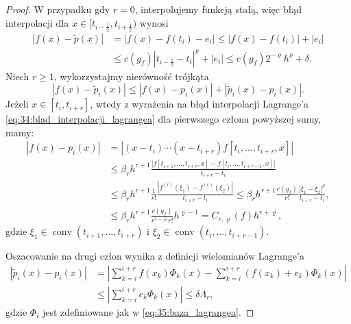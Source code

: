 \documentclass[oik, pdftex, man]{mgrwms}
\DeclareMathOperator*{\conv}{conv}
\begin{document}
    \begin{proof}
        W przypadku gdy $r=0$, interpolujemy funkcją stałą, więc błąd interpolacji dla $x \in [t_{i - \frac{1}{2}}, t_{i + \frac{1}{2}})$ wynosi
        \begin{equation*}
            \begin{aligned}                
                |f(x) - \tilde{p}(x)| &= |f(x) - f(t_{i}) - e_{i}| \leq |f(x) - f(t_{i})| + |e_{i}| \\
                    &\leq c(g_{f}) \left|t_{i-\frac{1}{2}} - t_{i}\right|^{\varrho} + |e_{i}| \leq c(g_{f}) 2^{-\varrho}h^{\varrho} + \delta.
            \end{aligned}
        \end{equation*}
        Niech $r \geq 1$, wykorzystajmy nierówność trójkąta
        \begin{equation*}
            \left|f(x)-\tilde{p}_{i}(x)\right| \leq\left|f(x)-p_{i}(x)\right|+\left|\tilde{p}_{i}(x)-p_{i}(x)\right|.
        \end{equation*}
        Jeżeli $x \in\left[t_{i}, t_{i+r}\right]$, wtedy z wyrażenia na błąd interpolacji Lagrange'a \eqref{eq:34:blad_interpolacji_lagrangea} dla pierwszego członu powyższej sumy, mamy:
        \begin{equation} \label{eq:36}
            \begin{aligned}
                \left|f(x)-p_{i}(x)\right| &=\left|\left(x-t_{i}\right) \cdots\left(x-t_{i+r}\right) f\left[t_{i}, \ldots, t_{i+r}, x\right]\right| \\
                & \leq \beta_{r} h^{r+1} \frac{\left|f\left[t_{i+1}, \ldots, t_{i+r}, x\right]-f\left[t_{i}, \ldots, t_{i+r-1}, x\right]\right|}{t_{i+r}-t_{i}} \\
                & \leq \beta_{r} h^{r+1} \frac{1}{r!} \frac{\left|f^{(r)}(\xi_{1})-f^{(r)}(\xi_{2})\right|}{t_{i+r}-t_{i}} 
                    \leq \beta_{r} h^{r+1} \frac{c(g_{f})}{r!} \frac{\left|\xi_{1}-\xi_{2}\right|^{\varrho}}{t_{i+r}-t_{i}}, \\
                & \leq \beta_{r} h^{r+1} \frac{c\left(g_{f}\right)}{r^{1-\varrho} r !} h^{\varrho-1}=C_{r, \varrho}(f) h^{r+\varrho},
            \end{aligned}
        \end{equation}
        gdzie $\xi_{1} \in \conv(t_{i+1}, \ldots, t_{i+r})$ i $\xi_{2} \in \conv(t_{i}, \ldots, t_{i+r-1})$.

        Oszacowanie na drugi człon wynika z definicji wielomianów Lagrange'a
        \begin{equation} \label{eq:1}
            \begin{aligned}
                \left|\tilde{p}_{i}(x)-p_{i}(x)\right| &=\left|\sum_{k=i}^{i+r} f(x_{k}) \Phi_{k}(x) - \sum_{k=i}^{i+r} (f(x_{k}) + e_{k}) \Phi_{k}(x)\right| \\
                    & \leq \left|\sum_{k=i}^{i+r} e_{k} \Phi_{k}(x)\right| \leq \delta \Lambda_{r},
            \end{aligned}
        \end{equation}
        gdzie $\Phi_{i}$ jest zdefiniowane jak w \eqref{eq:35:baza_lagrangea}.


\end{proof}
\end{document}
